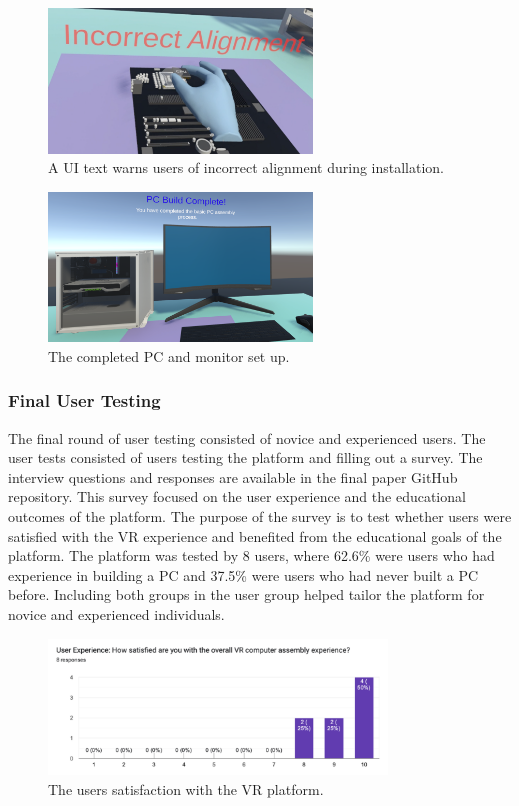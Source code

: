 \documentclass[10pt,twocolumn]{article}
\begin{document}
\begin{figure}
    \centering
    \includegraphics[width=7cm]{images/ErrorHandling.png}
    \caption{A UI text warns users of incorrect alignment during installation.}
\end{figure}

\begin{figure}
    \centering
    \includegraphics[width=7cm]{images/CompletedBuild.png}
    \caption{The completed PC and monitor set up.}
\end{figure}

\subsubsection{Final User Testing}

\par The final round of user testing consisted of novice and experienced users. The user tests consisted of users testing the platform and filling out a survey. The interview questions and responses are available in the final paper GitHub repository. This survey focused on the user experience and the educational outcomes of the platform. The purpose of the survey is to test whether users were satisfied with the VR experience and benefited from the educational goals of the platform. The platform was tested by 8 users, where 62.6\% were users who had experience in building a PC and 37.5\% were users who had never built a PC before. Including both groups in the user group helped tailor the platform for novice and experienced individuals. 

\begin{figure}
    \centering
    \includegraphics[width=9cm]{images/VRSatisfaction.png}
    \caption{The users satisfaction with the VR platform.}
\end{figure}
\end{document}
